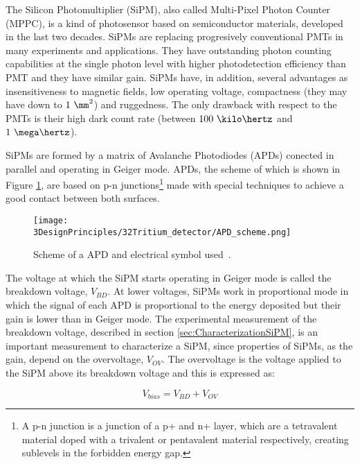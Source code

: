 The Silicon Photomultiplier (SiPM), also called Multi-Pixel Photon Counter (MPPC), is a kind of photosensor based on semiconductor materials, developed in the last two decades. SiPMs are replacing progresively conventional PMTs in many experiments and applications. They have outstanding photon counting capabilities at the single photon level with higher photodetection efficiency than PMT and they have similar gain. SiPMs have, in addition, several advantages as insensitiveness to magnetic fields, low operating voltage, compactness (they may have down to $1~\mm^2$) and ruggedness. The only drawback with respect to the PMTs is their high dark count rate (between $100~\kilo\hertz$ and $1~\mega\hertz$).

SiPMs are formed by a matrix of Avalanche Photodiodes (APDs) conected in parallel and operating in Geiger mode. APDs, the scheme of which is shown in Figure \ref{fig:SchemeAPD}, are based on p-n junctions\footnote{A p-n junction is a junction of a p+ and n+ layer, which are a tetravalent material doped with a trivalent or pentavalent material respectively, creating sublevels in the forbidden energy gap.} made with special techniques to achieve a good contact between both surfaces.

\begin{figure}[htbp]
\centering
\texttt{[image: 3DesignPrinciples/32Tritium\_detector/APD\_scheme.png]}
\caption{Scheme of a APD and electrical symbol used\label{fig:SchemeAPD}~\cite{OSI}.}
\end{figure}
 

The voltage at which the SiPM starts operating in Geiger mode is called the breakdown voltage, $V_ {BD}$. At lower voltages, SiPMs work in proportional mode in which the signal of each APD is proportional to the energy deposited but their gain is lower than in Geiger mode. The experimental measurement of the breakdown voltage, described in section \ref{sec:CharacterizationSiPM}, is an important measurement to characterize a SiPM, since properties of SiPMs, as the gain, depend on the overvoltage, $V_{OV}$. The overvoltage is the voltage applied to the SiPM above its breakdown voltage and this is expressed as:

\begin{equation}
V_{bias}=V_{BD}+V_{OV}
\label{overvoltage}
\end{equation}

